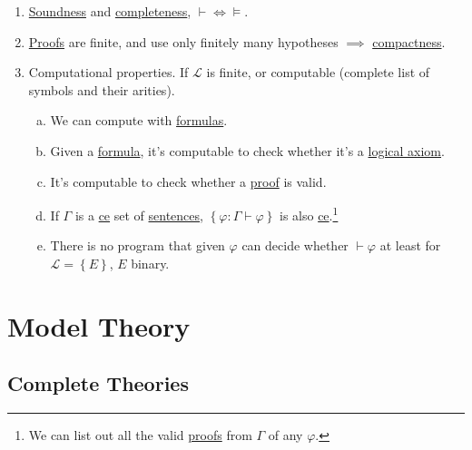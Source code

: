 \begin{enumerate}[(1)]
	\item \hyperref[thm:soundness]{Soundness} and \hyperref[thm:completeness]{completeness}, \(\vdash \iff \models \).
	\item \hyperref[def:proof]{Proofs} are finite, and use only finitely many hypotheses \(\implies \) \hyperref[thm:compactness]{compactness}.
	\item Computational properties. If \(\mathcal{L} \) is finite, or computable (complete list of symbols and their arities).
	      \begin{enumerate}[(a)]
		      \item We can compute with \hyperref[def:formula]{formulas}.
		      \item Given a \hyperref[def:formula]{formula}, it's computable to check whether it's a \hyperref[def:logical-axioms]{logical axiom}.
		      \item It's computable to check whether a \hyperref[def:proof]{proof} is valid.
		      \item If \(\Gamma \) is a \hyperref[def:computably-enumerable]{ce} set of \hyperref[def:sentence]{sentences}, \(\left\{ \varphi \colon \Gamma \vdash \varphi \right\} \) is also \hyperref[def:computably-enumerable]{ce}.\footnote{We can list out all the valid \hyperref[def:proof]{proofs} from \(\Gamma \) of any \(\varphi \).}
		      \item There is no program that given \(\varphi \) can decide whether \(\vdash \varphi \) at least for \(\mathcal{L} =\left\{ E \right\} \), \(E\) binary.
	      \end{enumerate}
\end{enumerate}

\section{Model Theory}
\subsection{Complete Theories}

